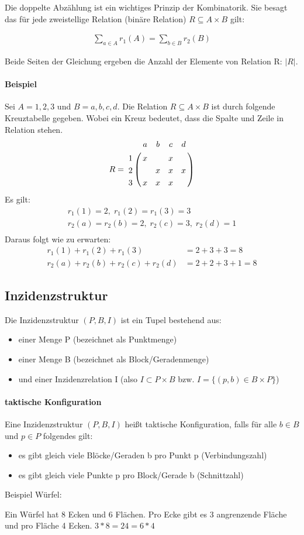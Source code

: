 Die doppelte Abzählung ist ein wichtiges Prinzip der Kombinatorik.
Sie besagt das für jede zweistellige Relation (binäre Relation) $R \subseteq A \times B$
gilt:

\begin{align}
  \sum_{a \in A} r_{1}(A) = \sum_{b \in B} r_{2}(B)
\end{align}

Beide Seiten der Gleichung ergeben die Anzahl der Elemente von Relation R: $|R|$.

\paragraph{Beispiel}
Sei $A = {1, 2, 3}$ und $B = {a, b, c, d}$. Die Relation $R \subseteq
A \times B$ ist durch folgende Kreuztabelle gegeben. Wobei ein
Kreuz bedeutet, dass die Spalte und Zeile in Relation stehen.
\begin{align*}
  R =
  \bordermatrix{
    & a & b & c & d \cr
   1& x &   & x &   \cr
   2&   & x & x & x \cr
   3& x & x & x &   \cr
  }
\end{align*}
Es gilt:
\begin{align*}
  r_{1}(1)=2,\; r_{1}(2)=r_{1}(3)=3\\
  r_{2}(a)=r_{2}(b)=2,\; r_{2}(c)=3,\; r_{2}(d)=1\\
\end{align*}
Daraus folgt wie zu erwarten:
\begin{align*}
  r_{1}(1) + r_{1}(2) + r_{1}(3) &= 2 + 3 + 3 = 8\\
  r_{2}(a) + r_{2}(b) + r_{2}(c) + r_{2}(d) &= 2 + 2 + 3 + 1 = 8
\end{align*}


\subsection{Inzidenzstruktur}
Die Inzidenzstruktur $(P,B,I)$ ist ein Tupel bestehend aus:
\begin{itemize}
\item einer Menge P (bezeichnet als Punktmenge)
\item einer Menge B (bezeichnet als Block/Geradenmenge)
\item und einer Inzidenzrelation I (also $I \subset P\times B$ bzw.
  $I = \{(p,b) \in B \times P\}$)
\end{itemize}

\paragraph{taktische Konfiguration}
Eine Inzidenzstruktur $(P,B,I)$ heißt taktische Konfiguration, falls
für alle $b\in B$ und $p \in P$ folgendes gilt:
\begin{itemize}
\item es gibt gleich viele Blöcke/Geraden b pro Punkt p (Verbindungszahl)
\item es gibt gleich viele Punkte p pro Block/Gerade b (Schnittzahl)
\end{itemize}

Beispiel Würfel:

Ein Würfel hat 8 Ecken und 6 Flächen. Pro Ecke gibt es 3 angrenzende
Fläche und pro Fläche 4 Ecken. $3 * 8 = 24 = 6 * 4$


